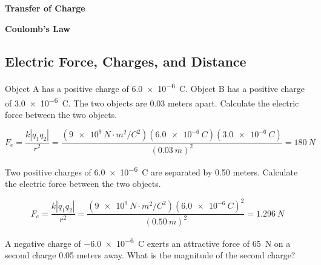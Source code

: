 \documentclass[]{exam}
\begin{document}
\clearpage

\textbf{\Large Transfer of Charge}


\clearpage

\textbf{\Large Coulomb’s Law}

\subsection{Electric Force, Charges, and Distance}

\begin{questions}

\question
Object A has a positive charge of \SI{6.0e-6}{C}. Object B has a positive charge of \SI{3.0e-6}{C}. The two objects are 0.03 meters apart. Calculate the electric force between the two objects. 

\begin{solution}
\begin{equation*}
    F_e = \frac{k\left|q_1 q_2\right|}{r^2} = \frac{\left(\SI{9e9}{N\cdot m^2/C^2}\right)(\SI{6.0e-6}{C})(\SI{3.0e-6}{C})}{\left(\SI{0.03}{m}\right)^2} = \boxed{\SI{180}{N}}
\end{equation*}
\end{solution}

\question
Two positive charges of \SI{6.0e-6}{C} are separated by 0.50 meters. Calculate the electric force between the two objects. 

\begin{solution}
\begin{equation*}
    F_e = \frac{k\left|q_1 q_2\right|}{r^2} = \frac{\left(\SI{9e9}{N\cdot m^2/C^2}\right)\left(\SI{6.0e-6}{C}\right)^2}{\left(\SI{0.50}{m}\right)^2} = \boxed{\SI{1.296}{N}}
\end{equation*}
\end{solution}

\question
A negative charge of \SI{-6.0e-6}{C} exerts an attractive force of \SI{65}{N} on a second charge 0.05 meters away. What is the magnitude of the second charge?


\end{questions}
\end{document}
